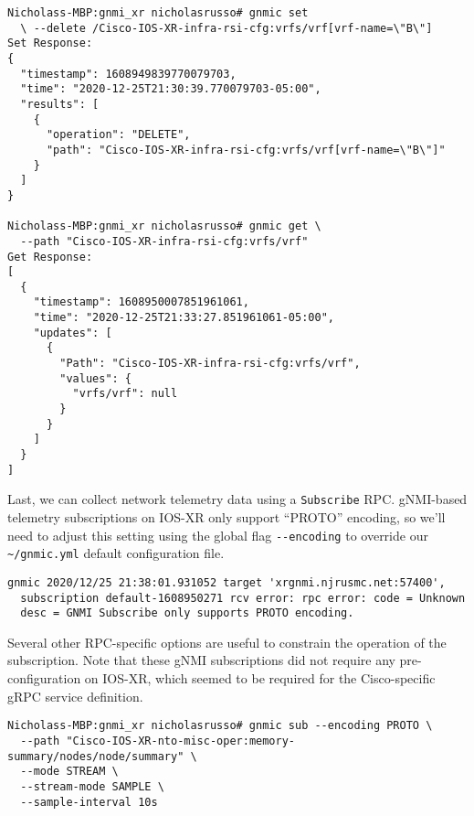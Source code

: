 \begin{verbatim}
Nicholass-MBP:gnmi_xr nicholasrusso# gnmic set
  \ --delete /Cisco-IOS-XR-infra-rsi-cfg:vrfs/vrf[vrf-name=\"B\"]
Set Response:
{
  "timestamp": 1608949839770079703,
  "time": "2020-12-25T21:30:39.770079703-05:00",
  "results": [
    {
      "operation": "DELETE",
      "path": "Cisco-IOS-XR-infra-rsi-cfg:vrfs/vrf[vrf-name=\"B\"]"
    }
  ]
}

Nicholass-MBP:gnmi_xr nicholasrusso# gnmic get \
  --path "Cisco-IOS-XR-infra-rsi-cfg:vrfs/vrf"
Get Response:
[
  {
    "timestamp": 1608950007851961061,
    "time": "2020-12-25T21:33:27.851961061-05:00",
    "updates": [
      {
        "Path": "Cisco-IOS-XR-infra-rsi-cfg:vrfs/vrf",
        "values": {
          "vrfs/vrf": null
        }
      }
    ]
  }
]
\end{verbatim}

Last, we can collect network telemetry data using a \verb|Subscribe|
RPC\@. gNMI-based telemetry subscriptions on IOS-XR only support ``PROTO''
encoding, so we'll need to adjust this setting using the global flag
\verb|--encoding| to override our \verb|~/gnmic.yml| default configuration
file.

\begin{verbatim}
gnmic 2020/12/25 21:38:01.931052 target 'xrgnmi.njrusmc.net:57400',
  subscription default-1608950271 rcv error: rpc error: code = Unknown
  desc = GNMI Subscribe only supports PROTO encoding.
\end{verbatim}

Several other RPC-specific options are useful to constrain the
operation of the subscription. Note that these gNMI subscriptions did not
require any pre-configuration on IOS-XR, which seemed to be required for
the Cisco-specific gRPC service definition.

\begin{verbatim}
Nicholass-MBP:gnmi_xr nicholasrusso# gnmic sub --encoding PROTO \
  --path "Cisco-IOS-XR-nto-misc-oper:memory-summary/nodes/node/summary" \
  --mode STREAM \
  --stream-mode SAMPLE \
  --sample-interval 10s
\end{verbatim}

